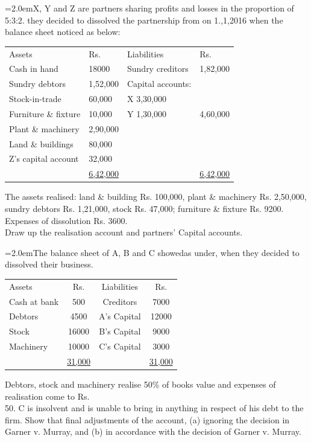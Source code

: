\documentclass[11pt,a4paper]{article}
\newcommand{\lqn}[2]{\Needspace{6\baselineskip}\par\medskip\noindent\hangindent=2.0em\hangafter=1\makebox[2.0em][l]{\textbf{#1.}}#2\par}
\begin{document}
\lqn{114}{X, Y and Z are partners sharing profits and losses in the proportion of 5:3:2. they decided to dissolved the partnership from on 1.,1,2016 when the balance sheet noticed as below:\par
\par\smallskip\noindent\hspace*{1.2em}\begin{tabular}{llll}
Assets & Rs. & Liabilities & Rs. \\
Cash in hand & 18000 & Sundry creditors & 1,82,000 \\
Sundry debtors & 1,52,000 & Capital accounts: &  \\
Stock-in-trade & 60,000 & X                    3,30,000 &  \\
Furniture \& fixture & 10,000 & Y                    1,30,000 & 4,60,000 \\
Plant \& machinery & 2,90,000 &  &  \\
Land \& buildings & 80,000 &  &  \\
Z’s capital account & 32,000 &  &  \\
 & \underline{\underline{6,42,000}} &  & \underline{\underline{6,42,000}} \\
\end{tabular}\par\smallskip
The assets realised: land \& building Rs. 100,000, plant \& machinery Rs. 2,50,000, sundry debtors Rs. 1,21,000, stock Rs. 47,000; furniture \& fixture Rs. 9200. Expenses of dissolution Rs. 3600.\\
Draw up the realisation account and partners’ Capital accounts.\par
}
\lqn{115}{The balance sheet of A, B and C showedas under, when they decided to dissolved their business.\par
\par\smallskip\noindent\hspace*{1.2em}\begin{tabular}{|lccc|}
\hline
Assets & Rs. & Liabilities & Rs. \\
Cash at bank & 500 & Creditors & 7000 \\
Debtors & 4500 & A’s Capital & 12000 \\
Stock & 16000 & B’s Capital & 9000 \\
Machinery & 10000 & C’s Capital & 3000 \\
 & \underline{31,000} &  & \underline{31,000} \\
\hline
\end{tabular}\par\smallskip
Debtors, stock and machinery realise 50\% of books value and expenses of realisation come to Rs.\\
50. C is insolvent and is unable to bring in anything in respect of his debt to the firm. Show that final adjustments of the account, (a) ignoring the decision in Garner v. Murray, and (b) in accordance with the decision of Garner v. Murray.\par
}
\end{document}
